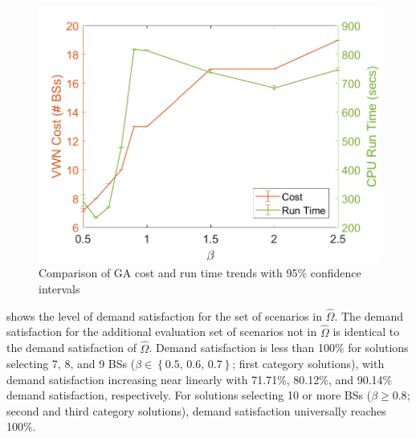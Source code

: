\documentclass[12pt,dvipsnames]{report}
\begin{document}
\begin{figure}[htp]
	\centering
	\includegraphics[height=0.4\textheight]{Figures/CaseI_GAComparisonCostRuntime}
	\caption[Comparison of GA approach cost and run time for Case I simulations]{Comparison of GA cost and run time trends with 95\% confidence intervals}
	\label{fig:CaseI_GAComparisonCostRunTime}
\end{figure}

 shows the level of demand satisfaction for the set of scenarios in $\hat{\Omega}$.  The demand satisfaction for the additional evaluation set of scenarios not in $\hat{\Omega}$ is identical to the demand satisfaction of $\hat{\Omega}$.  Demand satisfaction is less than 100\% for solutions selecting 7, 8, and 9 BSs ($\beta \in \left\{ 0.5,\, 0.6,\, 0.7 \right\}$; first category solutions), with demand satisfaction increasing near linearly with 71.71\%, 80.12\%, and 90.14\% demand satisfaction, respectively.  For solutions selecting 10 or more BSs ($\beta \geq 0.8$; second and third category solutions), demand satisfaction universally reaches 100\%.
\end{document}
